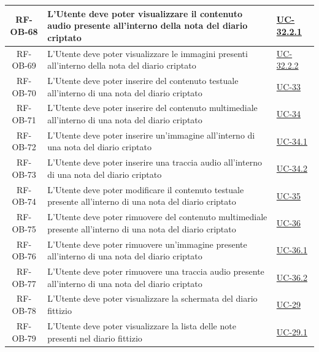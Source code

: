 \documentclass[a4paper,12pt]{article}
\begin{document}
\begin{center}
\begin{longtable}{|c|p{8.5cm}|>{\centering\arraybackslash}p{4cm}|}
RF-OB-68 & L'Utente deve poter visualizzare il contenuto audio presente all'interno della nota del diario criptato & \hyperref[subsec:UC-32.2.1]{UC-32.2.1} \\
\hline

RF-OB-69 & L'Utente deve poter visualizzare le immagini presenti all'interno della nota del diario criptato & \hyperref[subsec:UC-32.2.2]{UC-32.2.2} \\
\hline

RF-OB-70 & L'Utente deve poter inserire del contenuto testuale all'interno di una nota del diario criptato & \hyperref[subsec:UC-33]{UC-33} \\
\hline

RF-OB-71 & L'Utente deve poter inserire del contenuto multimediale all'interno di una nota del diario criptato & \hyperref[subsec:UC-34]{UC-34} \\
\hline

RF-OB-72 & L'Utente deve poter inserire un'immagine all'interno di una nota del diario criptato & \hyperref[subsec:UC-34.1]{UC-34.1} \\
\hline

RF-OB-73 & L'Utente deve poter inserire una traccia audio all'interno di una nota del diario criptato & \hyperref[subsec:UC-34.2]{UC-34.2} \\
\hline

RF-OB-74 & L'Utente deve poter modificare il contenuto testuale presente all'interno di una nota del diario criptato & \hyperref[subsec:UC-35]{UC-35} \\
\hline

RF-OB-75 & L'Utente deve poter rimuovere del contenuto multimediale presente all'interno di una nota del diario criptato & \hyperref[subsec:UC-36]{UC-36} \\
\hline

RF-OB-76 & L'Utente deve poter rimuovere un'immagine presente all'interno di una nota del diario criptato & \hyperref[subsec:UC-36.1]{UC-36.1} \\
\hline

RF-OB-77 & L'Utente deve poter rimuovere una traccia audio presente all'interno di una nota del diario criptato & \hyperref[subsec:UC-36.2]{UC-36.2} \\
\hline

RF-OB-78 & L'Utente deve poter visualizzare la schermata del diario fittizio & \hyperref[subsec:UC-29]{UC-29} \\
\hline

RF-OB-79 & L'Utente deve poter visualizzare la lista delle note presenti nel diario fittizio & \hyperref[subsec:UC-29.1]{UC-29.1} \\
\hline


\end{longtable}
\end{center}
\end{document}
